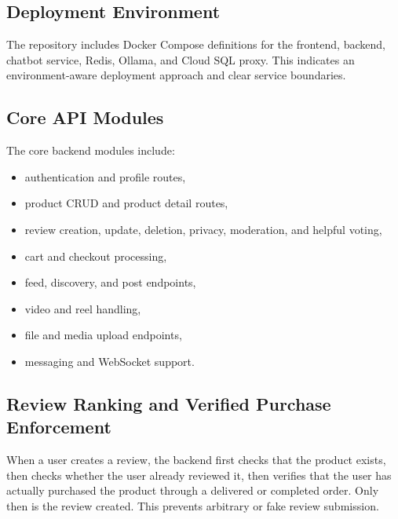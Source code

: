 \documentclass[12pt,letterpaper]{report}
\begin{document}
\subsection{Deployment Environment}

The repository includes Docker Compose definitions for the frontend, backend, chatbot service, Redis, Ollama, and Cloud SQL proxy. This indicates an environment-aware deployment approach and clear service boundaries.

\subsection{Core API Modules}

The core backend modules include:

\begin{itemize}
  \item authentication and profile routes,
  \item product CRUD and product detail routes,
  \item review creation, update, deletion, privacy, moderation, and helpful voting,
  \item cart and checkout processing,
  \item feed, discovery, and post endpoints,
  \item video and reel handling,
  \item file and media upload endpoints,
  \item messaging and WebSocket support.
\end{itemize}


\subsection{Review Ranking and Verified Purchase Enforcement}

When a user creates a review, the backend first checks that the product exists, then checks whether the user already reviewed it, then verifies that the user has actually purchased the product through a delivered or completed order. Only then is the review created. This prevents arbitrary or fake review submission.
\end{document}
